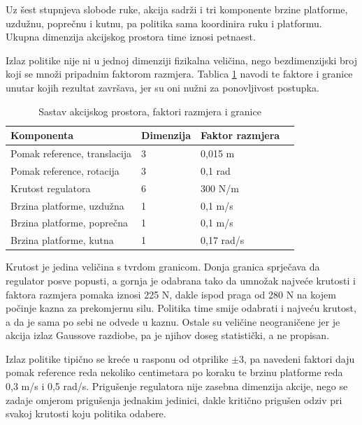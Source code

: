 Uz šest stupnjeva slobode ruke, akcija sadrži i tri komponente brzine platforme, uzdužnu,
poprečnu i kutnu, pa politika sama koordinira ruku i platformu. Ukupna dimenzija akcijskog
prostora time iznosi petnaest.

Izlaz politike nije ni u jednoj dimenziji fizikalna veličina, nego bezdimenzijski broj koji se
množi pripadnim faktorom razmjera. Tablica \ref{tab:akcije} navodi te faktore i granice unutar
kojih rezultat završava, jer su oni nužni za ponovljivost postupka.

\begin{table}[H]
    \centering
    \caption{Sastav akcijskog prostora, faktori razmjera i granice}
    \label{tab:akcije}
    \begin{tabular}{@{}llll@{}}
        \toprule
        Komponenta                   & Dimenzija & Faktor razmjera \\
        \midrule
        Pomak reference, translacija & 3         & 0,015 m         \\
        Pomak reference, rotacija    & 3         & 0,1 rad         \\
        Krutost regulatora           & 6         & 300 N/m         \\
        Brzina platforme, uzdužna    & 1         & 0,1 m/s         \\
        Brzina platforme, poprečna   & 1         & 0,1 m/s         \\
        Brzina platforme, kutna      & 1         & 0,17 rad/s      \\
        \bottomrule
    \end{tabular}
\end{table}

Krutost je jedina veličina s tvrdom granicom. Donja granica sprječava da regulator posve popusti,
a gornja je odabrana tako da umnožak najveće krutosti i faktora razmjera pomaka iznosi 225 N,
dakle ispod praga od 280 N na kojem počinje kazna za prekomjernu silu. Politika time smije
odabrati i najveću krutost, a da je sama po sebi ne odvede u kaznu. Ostale su veličine
neograničene jer je akcija izlaz Gaussove razdiobe, pa je njihov doseg statistički, a ne propisan.

Izlaz politike tipično se kreće u rasponu od otprilike $\pm 3$, pa navedeni faktori daju pomak
reference reda nekoliko centimetara po koraku te brzinu platforme reda 0,3 m/s i 0,5 rad/s.
Prigušenje regulatora nije zasebna dimenzija akcije, nego se zadaje omjerom prigušenja jednakim
jedinici, dakle kritično prigušen odziv pri svakoj krutosti koju politika odabere.

